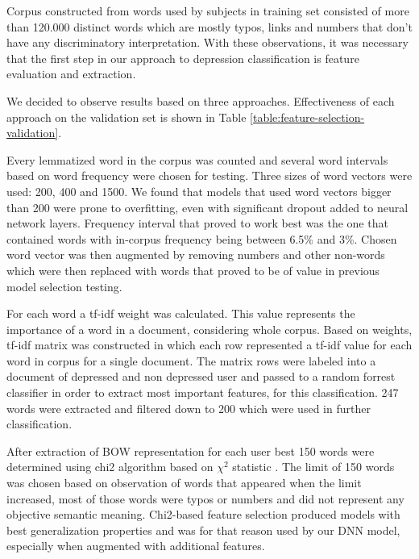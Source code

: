 \documentclass[10pt, a4paper]{article}
\begin{document}
Corpus constructed from words used by subjects in training set consisted of more than 120.000
 distinct words which are mostly typos, links and numbers that don't have any discriminatory
 interpretation. With these observations, it was necessary that the first step in our approach
 to depression classification is feature evaluation and extraction.

 We decided to observe results based on three approaches. Effectiveness of each approach on the validation
 set is shown in Table \ref{table:feature-selection-validation}.

\begin{description}[style=unboxed, leftmargin=0cm]
 \item[$\bullet$ augmented frequency interval feature selection:] Every lemmatized word in
 the corpus was counted and several word intervals based on word frequency were chosen for
 testing. Three sizes of word vectors were used: 200, 400 and 1500. We found that models that
 used word vectors bigger than 200 were prone to overfitting, even with significant dropout
 added to neural network layers. Frequency interval that proved to work best was the one
 that contained words with in-corpus frequency being between 6.5\% and 3\%. Chosen word
 vector was then augmented by removing numbers and other non-words which were then replaced
 with words that proved to be of value in previous model selection testing.
 \item[$\bullet$ term frequency-inverse document frequency feature selection:]
 For each word a tf-idf weight was calculated. This value represents the importance of a word in a document,
 considering whole corpus. Based on weights, tf-idf matrix was constructed in which each row represented
 a tf-idf value for each word in corpus for a single document. The matrix rows were labeled into a document of
 depressed and non depressed user and passed to a random forrest classifier in order to extract most important
 features, for this classification. 247 words were extracted and filtered down
 to 200 which were used in further classification.
 \item[$\bullet$ Chi2 feature selection:] After extraction of BOW representation for each
 user best 150 words were determined using chi2 algorithm based on $\chi^2$ statistic
 \cite{liu1995chi2}. The limit of 150 words was chosen based on observation of words that appeared
 when the limit increased, most of those words were typos or numbers and did not represent any
 objective semantic meaning. Chi2-based feature selection produced models with best generalization
 properties and was for that reason used by our DNN model, especially when augmented with additional features.
\end{description}
\end{document}
